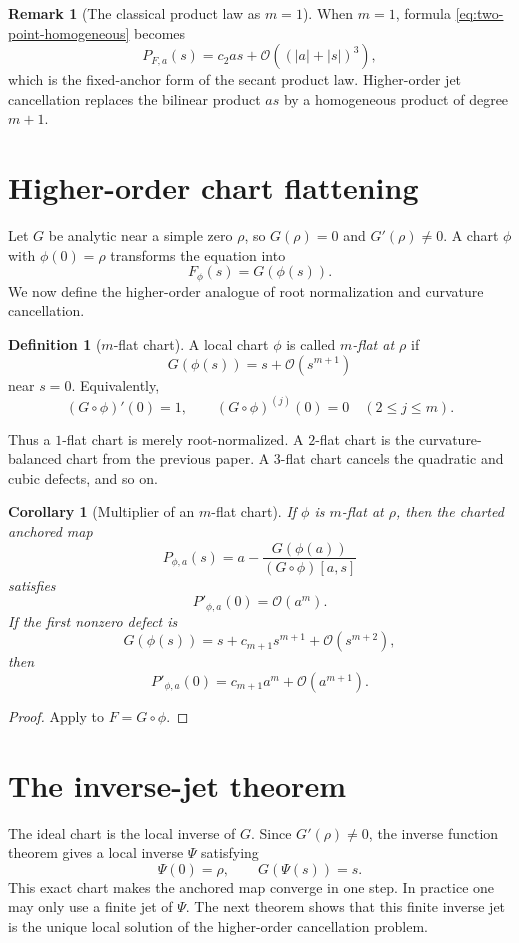 \documentclass[11pt]{article}
\newtheorem{corollary}[theorem]{Corollary}
\theoremstyle{definition}
\newtheorem{definition}[theorem]{Definition}
\newtheorem{remark}[theorem]{Remark}
\newcommand{\Oterm}{\mathcal{O}}
\begin{document}
\begin{remark}[The classical product law as $m=1$]
When $m=1$, formula \eqref{eq:two-point-homogeneous} becomes
\[
P_{F,a}(s)=c_2as+\Oterm((|a|+|s|)^3),
\]
which is the fixed-anchor form of the secant product law. Higher-order jet cancellation replaces the bilinear product $as$ by a homogeneous product of degree $m+1$.
\end{remark}

\section{Higher-order chart flattening}
Let $G$ be analytic near a simple zero $\rho$, so $G(\rho)=0$ and $G'(\rho)\neq0$. A chart $\phi$ with $\phi(0)=\rho$ transforms the equation into
\[
F_{\phi}(s)=G(\phi(s)).
\]
We now define the higher-order analogue of root normalization and curvature cancellation.

\begin{definition}[$m$-flat chart]
A local chart $\phi$ is called \emph{$m$-flat at $\rho$} if
\begin{equation}\label{eq:m-flat-chart}
G(\phi(s))=s+\Oterm(s^{m+1})
\end{equation}
near $s=0$. Equivalently,
\[
(G\circ\phi)'(0)=1,
\qquad
(G\circ\phi)^{(j)}(0)=0\quad(2\leq j\leq m).
\]
\end{definition}

Thus a $1$-flat chart is merely root-normalized. A $2$-flat chart is the curvature-balanced chart from the previous paper. A $3$-flat chart cancels the quadratic and cubic defects, and so on.

\begin{corollary}[Multiplier of an $m$-flat chart]\label{cor:m-flat-multiplier}
If $\phi$ is $m$-flat at $\rho$, then the charted anchored map
\[
P_{\phi,a}(s)=a-\frac{G(\phi(a))}{(G\circ\phi)[a,s]}
\]
satisfies
\[
P'_{\phi,a}(0)=\Oterm(a^m).
\]
If the first nonzero defect is
\[
G(\phi(s))=s+c_{m+1}s^{m+1}+\Oterm(s^{m+2}),
\]
then
\[
P'_{\phi,a}(0)=c_{m+1}a^m+\Oterm(a^{m+1}).
\]
\end{corollary}

\begin{proof}
Apply  to $F=G\circ\phi$.
\end{proof}

\section{The inverse-jet theorem}
The ideal chart is the local inverse of $G$. Since $G'(\rho)\neq0$, the inverse function theorem gives a local inverse $\Psi$ satisfying
\[
\Psi(0)=\rho,
\qquad
G(\Psi(s))=s.
\]
This exact chart makes the anchored map converge in one step. In practice one may only use a finite jet of $\Psi$. The next theorem shows that this finite inverse jet is the unique local solution of the higher-order cancellation problem.
\end{document}
